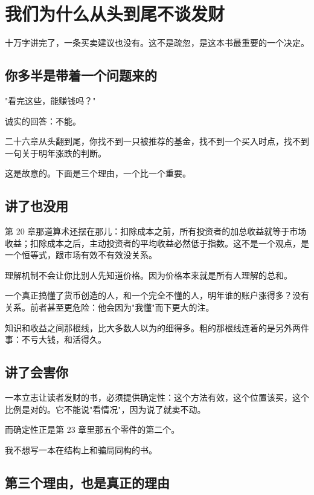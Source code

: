 \chapter{我们为什么从头到尾不谈发财}

\begin{ledetext}
十万字讲完了，一条买卖建议也没有。这不是疏忽，是这本书最重要的一个决定。
\end{ledetext}

\section{你多半是带着一个问题来的}

"看完这些，能赚钱吗？"

诚实的回答：不能。

二十六章从头翻到尾，你找不到一只被推荐的基金，找不到一个买入时点，找不到一句关于明年涨跌的判断。

这是故意的。下面是三个理由，一个比一个重要。

\section{讲了也没用}

第 20 章那道算术还摆在那儿：扣除成本之前，所有投资者的加总收益就等于市场收益；扣除成本之后，主动投资者的平均收益必然低于指数。这不是一个观点，是一个恒等式，跟市场有效不有效没关系。

理解机制不会让你比别人先知道价格。因为价格本来就是所有人理解的总和。

一个真正搞懂了货币创造的人，和一个完全不懂的人，明年谁的账户涨得多？没有关系。前者甚至更危险：他会因为"我懂"而下更大的注。

\begin{pullquote}{}
知识和收益之间那根线，比大多数人以为的细得多。粗的那根线连着的是另外两件事：不亏大钱，和活得久。
\end{pullquote}

\section{讲了会害你}

一本立志让读者发财的书，必须提供确定性：这个方法有效，这个位置该买，这个比例是对的。它不能说"看情况"，因为说了就卖不动。

而确定性正是第 23 章里那五个零件的第二个。

我不想写一本在结构上和骗局同构的书。

\section{第三个理由，也是真正的理由}

